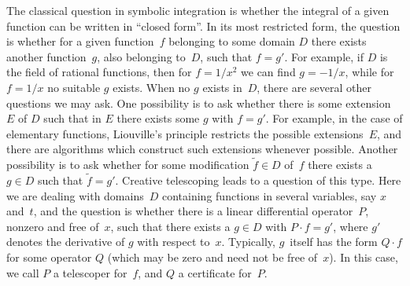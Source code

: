 \documentclass[final,1p,times,authoryear]{elsarticle}
\begin{document}
The classical question in symbolic integration is whether the integral of
a given function can be written in ``closed form''. In its most restricted form,
the question is whether for a given function~$f$ belonging to some domain $D$
there exists another function~$g$, also belonging to~$D$, such that $f=g'$. For
example, if $D$ is the field of rational functions, then for $f=1/x^2$ we can
find $g=-1/x$, while for $f=1/x$ no suitable $g$ exists. When no $g$ exists
in~$D$, there are several other questions we may ask. One possibility is to ask
whether there is some extension~$E$ of $D$ such that in $E$ there exists some
$g$ with $f=g'$. For example, in the case of elementary functions, Liouville's
principle restricts the possible extensions~$E$, and there are algorithms
which construct such extensions whenever possible. Another possibility is
to ask whether for some modification $\tilde f\in D$ of~$f$ there exists a $g\in
D$ such that $\tilde f=g'$. Creative telescoping leads to a question of this
type. Here we are dealing with domains~$D$ containing functions in several
variables, say $x$ and~$t$, and the question is whether there is a linear
differential operator~$P$, nonzero and free of~$x$, such that there exists a
$g\in D$ with $P\cdot f=g'$, where $g'$ denotes the derivative of $g$ with
respect to~$x$. Typically, $g$~itself has the form $Q\cdot f$ for some operator
$Q$ (which may be zero and need not be free of~$x$). In this case, we call $P$
a telescoper for~$f$, and $Q$ a certificate for~$P$.
\end{document}
